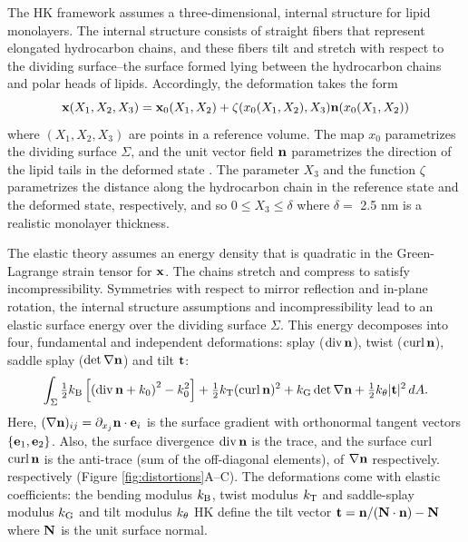 The HK framework assumes a three-dimensional, internal structure for lipid monolayers.
The internal structure consists of straight fibers that represent elongated hydrocarbon chains, and these fibers
tilt and stretch with respect to the dividing surface--the surface formed lying between the hydrocarbon chains and polar heads of lipids.
Accordingly, the deformation takes the form 
\begin{equation}
  \label{LMdeformation}
{\bf x}(X_1, X_2, X_3) = {\bf x}_0(X_1, X_2) + \zeta(x_0(X_1, X_2), X_3) {\bf n}(x_0(X_1, X_2))
\end{equation}
where $(X_1,X_2,X_3)$ are points in a reference volume.
The map $x_0$ parametrizes the dividing surface $\Sigma$, and the unit vector field ${\bf n}$ parametrizes the
direction of the lipid tails in the deformed state \cite{doi:10.1021/jp075641w,KLAUDA20083074}.
The parameter $X_3$ and the function $\zeta$ parametrizes the distance along the hydrocarbon chain in the reference state
and the deformed state, respectively, and so $0 \leq X_3 \leq \delta$ where $\delta = $ 2.5 nm is a realistic monolayer thickness. 

The elastic theory assumes an energy density that is quadratic in the Green-Lagrange strain tensor for ${\bf x}$. 
The chains stretch and compress to satisfy incompressibility.
Symmetries with respect to mirror reflection and in-plane rotation, the internal structure assumptions and incompressibility
lead to an elastic surface energy over the dividing surface $\Sigma$. 
This energy decomposes into four, fundamental and independent deformations:
splay ($\operatorname{div} {\bf n}$), twist ($\operatorname{curl} {\bf n}$), saddle splay ($\det \nabla {\bf n}$) and tilt ${\bf t}$:
\begin{equation}
\label{ansatz3}
\begin{aligned}
\int_{\Sigma} 
  \tfrac{1}{2}k_{\mathrm{B}}\left[ \left( \operatorname{div} {\bf n} + k_0\right)^2 - k_0^2\right] 
+ \tfrac{1}{2}k_{\mathrm{T}} (\operatorname{curl} {\bf n})^2 + k_{\mathrm{G}}  \det \nabla {\bf n} + \tfrac{1}{2}k_{\theta} |{\bf t}|^2 \,dA.
\end{aligned}
\end{equation}
Here, $(\nabla {\bf n})_{ij} = \partial_{x_j}{\bf n} \cdot {\bf e}_i$ is the surface gradient with
orthonormal tangent vectors $\{{\bf e}_1, {\bf e}_2\}$.
Also, the surface divergence 
$\operatorname{div} {\bf n}$ is the trace, and the surface curl $\operatorname{curl} {\bf n}$ is the anti-trace (sum of the off-diagonal elements), of $\nabla {\bf n}$ respectively.
respectively (Figure \ref{fig:distortions}A--C).
The deformations come with elastic coefficients: the bending modulus $k_{\mathrm{B}}$, twist modulus $k_{\mathrm{T}}$ 
and saddle-splay modulus $k_{\mathrm{G}}$ and tilt modulus $k_{\theta}$
HK define the tilt vector ${\bf t} = {\bf n}/({\bf N}\cdot {\bf n}) - {\bf N}$ where ${\bf N}$ is the unit surface normal.

